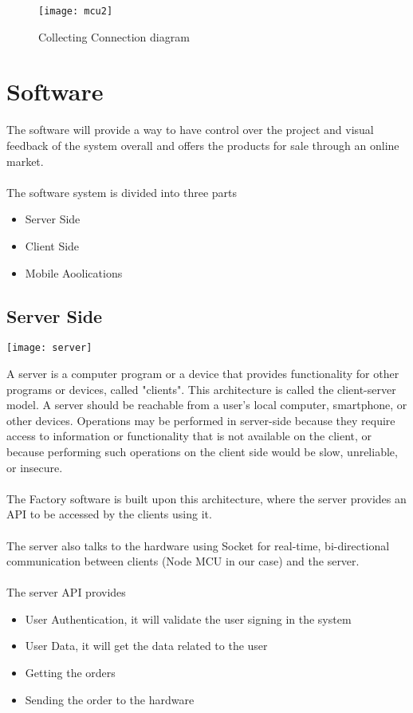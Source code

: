 \begin{figure}[h]
    \texttt{[image: mcu2]}
    \centering
    \caption{Collecting Connection diagram}
    \label{fig:arduino2}
\end{figure}


\chapter{Software}

The software will provide a way to have control over the project and visual feedback of the system
overall and offers the products for sale through an online market.\\\\
The software system is divided into three parts
\begin{itemize}
    \item Server Side
    \item Client Side
    \item Mobile Aoolications
\end{itemize}

\section{Server Side}

\begin{center}
    \texttt{[image: server]}
  \end{center}

  A server is a computer program or a device that provides functionality for other programs or devices,
called "clients". This architecture is called the client-server model. A server should be reachable from
a user's local computer, smartphone, or other devices. Operations may be performed in server-side
because they require access to information or functionality that is not available on the client, or
because performing such operations on the client side would be slow, unreliable, or insecure.\\\\
The Factory software is built upon this architecture, where the server provides an API to be accessed
by the clients using it.\\\\
The server also talks to the hardware using Socket for real-time, bi-directional communication
between clients (Node MCU in our case) and the server.\\\\
The server API provides
\begin{itemize}
    \item User Authentication, it will validate the user signing in the system
    \item User Data, it will get the data related to the user
    \item Getting the orders
    \item Sending the order to the hardware
\end{itemize}

